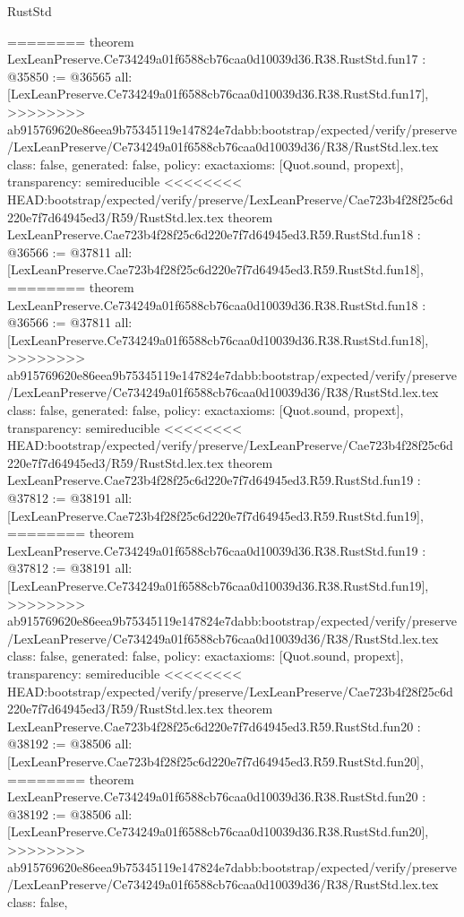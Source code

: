 \begin{lexlean}{RustStd}
\begin{coremodule}
{\begin{coremodule}
{{{{{{{{{{{{{{{{{{{{========
theorem LexLeanPreserve.Ce734249a01f6588cb76caa0d10039d36.R38.RustStd.fun17 : @35850 := @36565 {
  all: [LexLeanPreserve.Ce734249a01f6588cb76caa0d10039d36.R38.RustStd.fun17],
>>>>>>>> ab915769620e86eea9b75345119e147824e7dabb:bootstrap/expected/verify/preserve/LexLeanPreserve/Ce734249a01f6588cb76caa0d10039d36/R38/RustStd.lex.tex
  class: false,
  generated: false,
  policy: exact{axioms: [Quot.sound, propext]},
  transparency: semireducible
}
<<<<<<<< HEAD:bootstrap/expected/verify/preserve/LexLeanPreserve/Cae723b4f28f25c6d220e7f7d64945ed3/R59/RustStd.lex.tex
theorem LexLeanPreserve.Cae723b4f28f25c6d220e7f7d64945ed3.R59.RustStd.fun18 : @36566 := @37811 {
  all: [LexLeanPreserve.Cae723b4f28f25c6d220e7f7d64945ed3.R59.RustStd.fun18],
========
theorem LexLeanPreserve.Ce734249a01f6588cb76caa0d10039d36.R38.RustStd.fun18 : @36566 := @37811 {
  all: [LexLeanPreserve.Ce734249a01f6588cb76caa0d10039d36.R38.RustStd.fun18],
>>>>>>>> ab915769620e86eea9b75345119e147824e7dabb:bootstrap/expected/verify/preserve/LexLeanPreserve/Ce734249a01f6588cb76caa0d10039d36/R38/RustStd.lex.tex
  class: false,
  generated: false,
  policy: exact{axioms: [Quot.sound, propext]},
  transparency: semireducible
}
<<<<<<<< HEAD:bootstrap/expected/verify/preserve/LexLeanPreserve/Cae723b4f28f25c6d220e7f7d64945ed3/R59/RustStd.lex.tex
theorem LexLeanPreserve.Cae723b4f28f25c6d220e7f7d64945ed3.R59.RustStd.fun19 : @37812 := @38191 {
  all: [LexLeanPreserve.Cae723b4f28f25c6d220e7f7d64945ed3.R59.RustStd.fun19],
========
theorem LexLeanPreserve.Ce734249a01f6588cb76caa0d10039d36.R38.RustStd.fun19 : @37812 := @38191 {
  all: [LexLeanPreserve.Ce734249a01f6588cb76caa0d10039d36.R38.RustStd.fun19],
>>>>>>>> ab915769620e86eea9b75345119e147824e7dabb:bootstrap/expected/verify/preserve/LexLeanPreserve/Ce734249a01f6588cb76caa0d10039d36/R38/RustStd.lex.tex
  class: false,
  generated: false,
  policy: exact{axioms: [Quot.sound, propext]},
  transparency: semireducible
}
<<<<<<<< HEAD:bootstrap/expected/verify/preserve/LexLeanPreserve/Cae723b4f28f25c6d220e7f7d64945ed3/R59/RustStd.lex.tex
theorem LexLeanPreserve.Cae723b4f28f25c6d220e7f7d64945ed3.R59.RustStd.fun20 : @38192 := @38506 {
  all: [LexLeanPreserve.Cae723b4f28f25c6d220e7f7d64945ed3.R59.RustStd.fun20],
========
theorem LexLeanPreserve.Ce734249a01f6588cb76caa0d10039d36.R38.RustStd.fun20 : @38192 := @38506 {
  all: [LexLeanPreserve.Ce734249a01f6588cb76caa0d10039d36.R38.RustStd.fun20],
>>>>>>>> ab915769620e86eea9b75345119e147824e7dabb:bootstrap/expected/verify/preserve/LexLeanPreserve/Ce734249a01f6588cb76caa0d10039d36/R38/RustStd.lex.tex
  class: false,
}}}}}}}}}}}}}}}}}}}}}}}}
\end{coremodule}}
\end{coremodule}
\end{lexlean}
